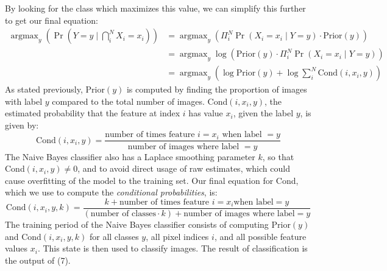 \documentclass{article}
\DeclareMathOperator*{\argmax}{argmax}
\begin{document}
  By looking for the class which maximizes this value, we can simplify this further to get our final equation:
  \begin{align}
  \argmax_y (\Pr(Y = y \mid \bigcap_i^NX_i = x_i)) &= \argmax_y( \Pi_i^N\Pr(X_i = x_i \mid Y = y) \cdot \text{Prior}(y)) \\
  &= \argmax_y \log (\text{Prior}(y) \cdot \Pi_i^N\Pr(X_i = x_i \mid Y = y)) \\
  &= \argmax_y (\log \text{Prior}(y) + \log \sum_i^N\text{Cond}(i, x_i, y))
  \end{align}
  As stated previously, Prior$(y)$ is computed by finding the proportion of images with label $y$ compared to the total number of images.
  Cond$(i, x_i, y)$, the estimated probability that the feature at index $i$ has value $x_i$, given the label $y$, is given by:
  \begin{equation}
  \text{Cond}(i, x_i, y) = \frac{\text{number of times feature $i = x_i$ when label $= y$}}{\text{number of images where label $= y$}}
  \end{equation}
  The Naive Bayes classifier also has a Laplace smoothing parameter $k$, so that Cond$(i, x_i, y) \ne 0$, and to avoid direct usage of raw estimates, which could cause overfitting of the model to the training set.
  Our final equation for Cond, which we use to compute the {\em conditional probabilities}, is:
  \begin{equation}
  \text{Cond}(i, x_i, y, k) = \frac{k + \text{number of times feature }i = x_i \text{when label}= y}{(\text{number of classes}\cdot k) + \text{number of images where label}= y}
  \end{equation}
  The training period of the Naive Bayes classifier consists of computing Prior$(y)$ and Cond$(i, x_i, y, k)$ for all classes $y$, all pixel indices $i$, and all possible feature values $x_i$.
  This state is then used to classify images. The result of classification is the output of (7).
\end{document}
